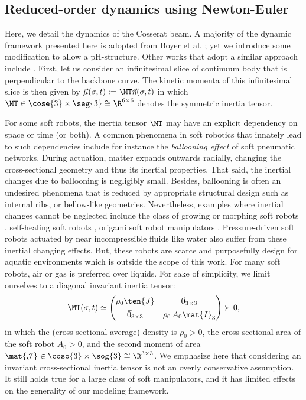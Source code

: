 \subsection{Reduced-order dynamics using Newton-Euler}
Here, we detail the dynamics of the Cosserat beam. A majority of the dynamic framework presented here is adopted from Boyer et al. \cite{Boyer2021}; yet we introduce some modification to allow a pH-structure. Other works that adopt a similar approach include \cite{Renda2018,Renda2020,Till2019,Garofalo2013}. First, let us consider an infinitesimal slice of continuum body that is perpendicular to the backbone curve. The kinetic momenta of this infinitesimal slice is then given by $\vec{\mu}(\sigma,t) := \MT \vec{\eta}(\sigma,t)$ in which $\MT \in \cose{3} \times \seg{3} \cong \R^{6\times 6}$ denotes the symmetric inertia tensor.
%
\begin{rmk}
  For some soft robots, the inertia tensor $\MT$ may have an explicit dependency on space or time (or both). A common phenomena in soft robotics that innately lead to such dependencies include for instance the \textit{ballooning effect} of soft pneumatic networks. During actuation, matter expands outwards radially, changing the cross-sectional geometry and thus its inertial properties. That said, the inertial changes due to ballooning is negligibly small. Besides, ballooning is often an undesired phenomena that is reduced by appropriate structural design such as internal ribs, or bellow-like geometries. Nevertheless, examples where inertial changes cannot be neglected include the class of growing or morphing soft robots \cite{Hawkes2017,Joachimczak2014Jul,Joachimczak2015}, self-healing soft robots \cite{Terryn2021Jul,Roels2020Dec}, origami soft robot manipulators \cite{Li2022Nov,Jiang2016Dec,Wu2021Sep}. Pressure-driven soft robots actuated by near incompressible fluids like water also suffer from these inertial changing effects. But, these robots are scarce and purposefully design for aquatic environments which is outside the scope of this work. For many soft robots, air or gas is preferred over liquids. 
For sake of simplicity, we limit ourselves to a diagonal invariant inertia tensor: 
%
\begin{equation*}
\MT(\sigma,t) \simeq \begin{pmatrix} \rho_0 \ten{J}  & \vec{0}_{3\times3}  \\[0.35em]
  \vec{0}_{3\times3} & \rho_0\, A_0\mat{I}_3 \end{pmatrix} \succ 0,
\end{equation*}
%
in which the (cross-sectional average) density is $\rho_0 > 0$, the cross-sectional area of the soft robot $A_0>0$, and the second moment of area $\mat{\mathcal{J}} \in \coso{3} \times \sog{3} \cong \R^{3\times 3}$.
We emphasize here that considering an invariant cross-sectional inertia tensor is not an overly conservative assumption. It still holds true for a large class of soft manipulators, and it has limited effects on the generality of our modeling framework. \end{rmk}
